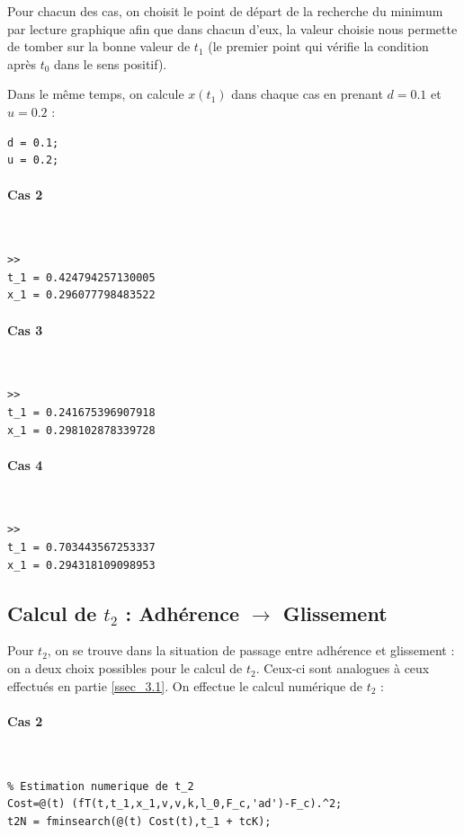 \documentclass{article}
\begin{document}
Pour chacun des cas, on choisit le point de départ de la recherche du minimum par lecture graphique afin que dans chacun d'eux, la valeur choisie nous permette de tomber sur la bonne valeur de $t_1$ (le premier point qui vérifie la condition après $t_0$ dans le sens positif). 

Dans le même temps, on calcule $x(t_1)$ dans chaque cas en prenant $d=0.1$ et $u=0.2$ : 

\begin{lstlisting}
d = 0.1;
u = 0.2;
\end{lstlisting}

\paragraph{Cas 2}
$ $ 
\begin{lstlisting}
>>
t_1 = 0.424794257130005
x_1 = 0.296077798483522
\end{lstlisting}

\paragraph{Cas 3}
$ $ 
\begin{lstlisting}
>>
t_1 = 0.241675396907918
x_1 = 0.298102878339728
\end{lstlisting}

\paragraph{Cas 4}
$ $
\begin{lstlisting}
>>
t_1 = 0.703443567253337
x_1 = 0.294318109098953
\end{lstlisting}

\subsection{Calcul de $t_2$ : Adhérence $\rightarrow$ Glissement}\label{ssec_4.2}
Pour $t_2$, on se trouve dans la situation de passage entre adhérence et glissement : on a deux choix possibles pour le calcul de $t_2$. Ceux-ci sont analogues à ceux effectués en partie \ref{ssec_3.1}. On effectue le calcul numérique de $t_2$ :

\paragraph{Cas 2}
$ $
\begin{lstlisting}
% Estimation numerique de t_2
Cost=@(t) (fT(t,t_1,x_1,v,v,k,l_0,F_c,'ad')-F_c).^2;
t2N = fminsearch(@(t) Cost(t),t_1 + tcK);
\end{lstlisting}
\end{document}
